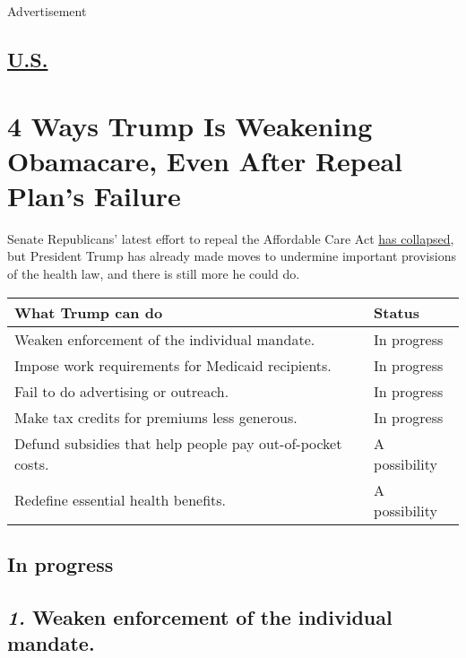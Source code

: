 Advertisement

\hypertarget{-us-}{%
\subsection{\texorpdfstring{
\href{https://www.nytimes3xbfgragh.onion/section/us}{U.S.}
}{ U.S. }}\label{-us-}}

\hypertarget{4-ways-trump-is-weakening-obamacare-even-after-repeal-plans-failure}{%
\section{4 Ways Trump Is Weakening Obamacare, Even After Repeal Plan's
Failure}\label{4-ways-trump-is-weakening-obamacare-even-after-repeal-plans-failure}}

Senate Republicans' latest effort to repeal the Affordable Care Act
\href{https://www.nytimes3xbfgragh.onion/interactive/2017/09/25/us/republicans-who-opposed-the-senate-health-care-bills.html}{has
collapsed}, but President Trump has already made moves to undermine
important provisions of the health law, and there is still more he could
do.

\begin{longtable}[]{@{}ll@{}}
\toprule
\textbf{What Trump can do} & \textbf{Status}\tabularnewline
\midrule
\endhead
Weaken enforcement of the individual mandate. & In
progress\tabularnewline
Impose work requirements for Medicaid recipients. & In
progress\tabularnewline
Fail to do advertising or outreach. & In progress\tabularnewline
Make tax credits for premiums less generous. & In
progress\tabularnewline
Defund subsidies that help people pay out-of-pocket costs. & A
possibility\tabularnewline
Redefine essential health benefits. & A possibility\tabularnewline
\bottomrule
\end{longtable}

\hypertarget{in-progress}{%
\subsection{In progress}\label{in-progress}}

\hypertarget{1-weaken-enforcement-of-the-individual-mandate}{%
\subsection{\texorpdfstring{\emph{\textbf{1.}} \textbf{Weaken
enforcement of the individual
mandate.}}{1. Weaken enforcement of the individual mandate.}}\label{1-weaken-enforcement-of-the-individual-mandate}}

